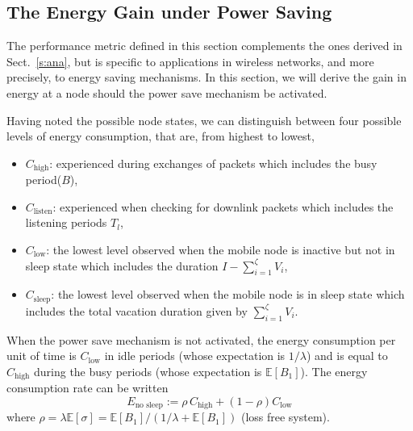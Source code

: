 \documentclass[journal]{IEEEtran}
\newcommand {\beq} {\begin{equation}}
\newcommand {\eeq} {\end{equation}}
\def \E{{\mathbb E}}
\begin{document}
\subsection{The Energy Gain under Power Saving}
The performance metric defined in this section complements the ones derived in Sect.~\ref{s:ana}, but is specific to applications in wireless networks, and more precisely, to energy saving mechanisms. In
this section, we will derive the gain in energy at a node should the power save mechanism be activated.

Having noted the possible node states, we can distinguish between four possible levels of energy consumption, that are, from highest to lowest,
\begin{itemize}
\item $C_{\textrm{high}}$: experienced during exchanges of packets which includes the busy period($B$),
\item $C_{\textrm{listen}}$: experienced when checking for downlink packets which includes the listening periods $T_l$,
\item $C_{\textrm{low}}$: the lowest level observed when the mobile
node is inactive but not in sleep state which includes the duration $I-\sum_{i=1}^\zeta V_i$,
\item $C_{\textrm{sleep}}$: the lowest level observed when the mobile
node is in sleep state which includes the total vacation duration given by $\sum_{i=1}^\zeta V_i$.
\end{itemize}
When the power save mechanism is not activated, the energy consumption per unit of time is $C_{\textrm{low}}$ in idle periods (whose expectation is $1/\lambda$) and is equal to $C_{\textrm{high}}$ during the busy periods (whose expectation is $\E[B_1]$). The energy consumption rate can be written
\beq
\label{e:Enosleep}
E_{\textrm{no sleep}} := \rho\, C_{\textrm{high}}+(1-\rho) C_{\textrm{low}}
\eeq
where $\rho=\lambda\E[\sigma]=\E[B_1]/(1/\lambda+\E[B_1])$ (loss free system).
\end{document}
